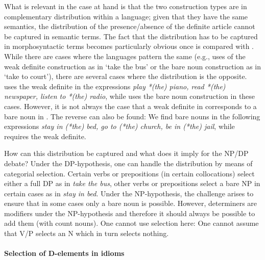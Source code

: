 \documentclass[output=paper,colorlinks,citecolor=black,
]{langscibook}
\begin{document}
\ea 
{}
    \z
    \z    
        
\noindent
What is relevant in the case at hand is that the two construction types are in complementary distribution within a language; given that they have the same semantics, the distribution of the presence/absence of the definite article cannot be captured in semantic terms. The fact that the distribution has to be captured in morphosyntactic terms becomes particularly obvious once  is compared with . While there are cases where the languages pattern the same (e.g., uses of the weak definite construction as in `take the bus' or the bare noun construction as in `take to court'), there are several cases where the distribution is the opposite.  uses the weak definite in the expressions \textit{play *(the) piano, read *(the) newspaper, listen to *(the) radio}, while  uses the bare noun construction in these cases. However, it is not always the case that a weak definite in  corresponds to a bare noun in . The reverse can also be found: We find bare nouns in the following  expressions \textit{stay in (*the) bed, go to (*the) church, be in (*the) jail}, while  requires the weak definite.

How can this distribution be captured and what does it imply for the NP/DP debate? Under the DP-hypothesis, one can handle the distribution by means of categorial selection. Certain verbs or prepositions (in certain collocations) select either a  full DP as in \textit{take the bus}, other verbs or prepositions select a bare NP in certain cases as in \textit{stay in bed}. Under the NP-hypothesis, the challenge arises to ensure that in some cases only a bare noun is possible. However, determiners are modifiers under the NP-hypothesis and therefore it should always be possible to add them (with count nouns). One cannot use selection here: One cannot assume that V/P selects an N which in turn selects nothing. 

 \paragraph{Selection of D-elements in idioms}
 
\end{document}
